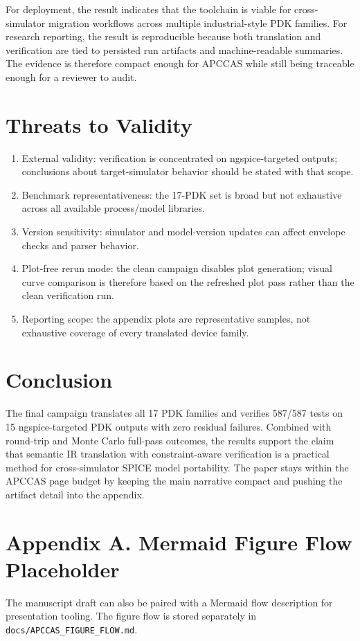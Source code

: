 \documentclass[10pt,twocolumn]{article}
\begin{document}
For deployment, the result indicates that the toolchain is viable for cross-simulator migration workflows across multiple industrial-style PDK families. For research reporting, the result is reproducible because both translation and verification are tied to persisted run artifacts and machine-readable summaries. The evidence is therefore compact enough for APCCAS while still being traceable enough for a reviewer to audit.

\section{Threats to Validity}
\begin{enumerate}
    \item External validity: verification is concentrated on ngspice-targeted outputs; conclusions about target-simulator behavior should be stated with that scope.
    \item Benchmark representativeness: the 17-PDK set is broad but not exhaustive across all available process/model libraries.
    \item Version sensitivity: simulator and model-version updates can affect envelope checks and parser behavior.
    \item Plot-free rerun mode: the clean campaign disables plot generation; visual curve comparison is therefore based on the refreshed plot pass rather than the clean verification run.
    \item Reporting scope: the appendix plots are representative samples, not exhaustive coverage of every translated device family.
\end{enumerate}

\section{Conclusion}
The final campaign translates all 17 PDK families and verifies 587/587 tests on 15 ngspice-targeted PDK outputs with zero residual failures. Combined with round-trip and Monte Carlo full-pass outcomes, the results support the claim that semantic IR translation with constraint-aware verification is a practical method for cross-simulator SPICE model portability. The paper stays within the APCCAS page budget by keeping the main narrative compact and pushing the artifact detail into the appendix.

\section*{Appendix A. Mermaid Figure Flow Placeholder}
The manuscript draft can also be paired with a Mermaid flow description for presentation tooling. The figure flow is stored separately in \texttt{docs/APCCAS\_FIGURE\_FLOW.md}.
\end{document}
